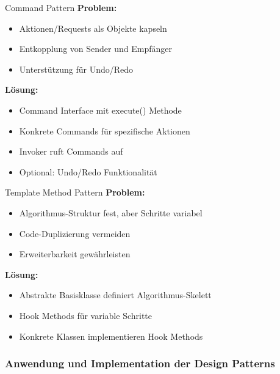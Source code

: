 \begin{definition}{Command Pattern}
\textbf{Problem:}
\begin{itemize}
   \item Aktionen/Requests als Objekte kapseln
   \item Entkopplung von Sender und Empfänger
   \item Unterstützung für Undo/Redo
\end{itemize}

\textbf{Lösung:}
\begin{itemize}
   \item Command Interface mit execute() Methode
   \item Konkrete Commands für spezifische Aktionen
   \item Invoker ruft Commands auf
   \item Optional: Undo/Redo Funktionalität
\end{itemize}
\end{definition}

\begin{definition}{Template Method Pattern}
\textbf{Problem:}
\begin{itemize}
   \item Algorithmus-Struktur fest, aber Schritte variabel
   \item Code-Duplizierung vermeiden
   \item Erweiterbarkeit gewährleisten
\end{itemize}

\textbf{Lösung:}
\begin{itemize}
   \item Abstrakte Basisklasse definiert Algorithmus-Skelett
   \item Hook Methods für variable Schritte
   \item Konkrete Klassen implementieren Hook Methods
\end{itemize}
\end{definition}

\subsubsection{Anwendung und Implementation der Design Patterns}



